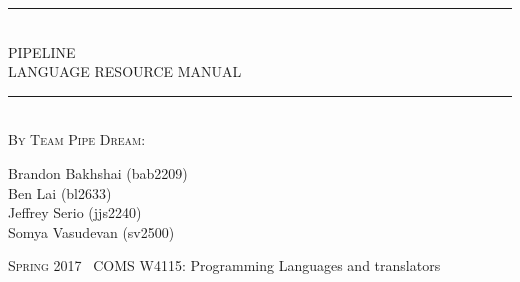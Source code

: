 \documentclass[./LRM_main.tex]{subfiles}
\begin{document}
  \begin{titlepage}
    \textheight
    \centering
    \vspace*{\baselineskip}
    \rule{\textwidth}{3pt}\\[\baselineskip]
    {\Huge PIPELINE \\[0.3\baselineskip] LANGUAGE RESOURCE MANUAL}\\[0.2\baselineskip]
    \rule{\textwidth}{3pt}\\[\baselineskip]
    \scshape
    \vspace*{2\baselineskip}
    By Team Pipe Dream: \\ %
    {\Large Brandon Bakhshai (bab2209) \\ Ben Lai (bl2633) \\ 
    Jeffrey Serio (jjs2240) \\ Somya Vasudevan (sv2500) \par}
    \vfill
    {\scshape Spring 2017} \ {\large COMS W4115: Programming Languages and translators}\par
  \end{titlepage}
  
\end{document}
